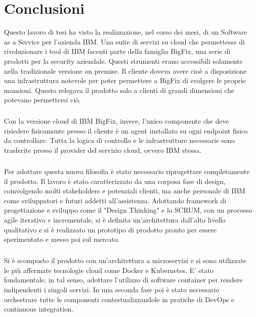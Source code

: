 \chapter{Conclusioni}

Questo lavoro di tesi ha visto la realizzazione, nel corso dei mesi, di un Software as a Service per l'azienda IBM. Una suite di servizi su cloud che permettesse di rivoluzionare i tool di IBM facenti parte della famiglia BigFix, una serie di prodotti per la security aziendale. Questi strumenti erano accessibili solamente nella tradizionale versione on premise. Il cliente doveva avere cioè a disposizione una infrastruttura notevole per poter permettere a BigFix di svolgere le proprie mansioni. Questo relegava il prodotto solo a clienti di grandi dimensioni che potevano permettersi ciò. 
\paragraph{}
Con la versione cloud di IBM BigFix, invece, l'unico componente che deve risiedere fisicamente presso il cliente è un agent installato su ogni endpoint fisico da controllare. Tutta la logica di controllo e le infrastrutture necessarie sono trasferite presso il provider del servizio cloud, ovvero IBM stessa.

\paragraph{}
Per adottare questa nuova filosofia è stato necessario riprogettare completamente il prodotto. Il lavoro è stato caratterizzato da una corposa fase di design, coinvolgendo molti stakeholders e potenziali clienti, ma anche personale di IBM come sviluppatori e futuri addetti all'assistenza. Adottando framework di progettazione e sviluppo come il "Design Thinking" e lo SCRUM, con un processo agile iterativo e incrementale, si è definita un'architettura dall'alto livello qualitativo e si è realizzato un prototipo di prodotto pronto per essere sperimentato e messo poi sul mercato.
\paragraph{}
Si è scomposto il prodotto con un'architettura a microservizi e si sono utilizzate le più affermate tecnologie cloud come Docker e Kubernetes. E' stato fondamentale, in tal senso, adottare l'utilizzo di software container per rendere indipendenti i singoli servizi. In una seconda fase poi è stato necessario orchestrare tutte le componenti contestualizzandole in pratiche di DevOps e continuous integration.

